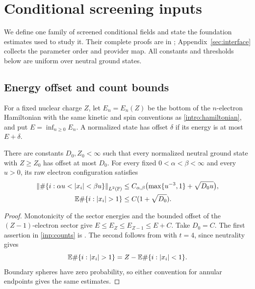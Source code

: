 \section{Conditional screening inputs}\label{sec:inputs}

We define one family of screened conditional fields and state the
foundation estimates used to study it.  Their complete proofs are in
\cite{OuterRadius}; Appendix~\ref{sec:interface} collects the parameter
order and provider map.  All constants and thresholds below are uniform
over neutral ground states.

\subsection{Energy offset and count bounds}

For a fixed nuclear charge $Z$, let $E_n=E_n(Z)$ be the bottom of the
$n$-electron Hamiltonian with the same kinetic and spin conventions as
\eqref{intro:hamiltonian}, and put $E=\inf_{n\ge0}E_n$.
A normalized state has offset $\delta$ if its energy is at most $E+\delta$.

\begin{proposition}\label{inp:energy-counts}
There are constants $D_0,Z_0<\infty$ such that every normalized neutral
ground state with $Z\ge Z_0$ has offset at most $D_0$.
For every fixed $0<\alpha<\beta<\infty$ and every $u>0$, its raw
electron configuration satisfies
\begin{equation}\label{inp:counts}
 \begin{aligned}
 \left\|\#\{i:\alpha u<|x_i|<\beta u\}\right\|_{L^2(\Prob)}
 &\le C_{\alpha,\beta}
       \bigl(\max\{u^{-3},1\}+\sqrt{D_0u}\bigr),\\
 \E\#\{i:|x_i|>1\}&\le C(1+\sqrt{D_0}).
 \end{aligned}
\end{equation}
\end{proposition}

\begin{proof}
Monotonicity of the sector energies
\cite[\FoundationMonotonicity]{OuterRadius} and the bounded offset of the
$(Z-1)$-electron sector \cite[\FoundationOffset]{OuterRadius} give
$E\le E_Z\le E_{Z-1}\le E+C$.  Take $D_0=C$.
The first assertion in \eqref{inp:counts} is
\cite[\FoundationCounts]{OuterRadius}.  The second follows from
\cite[\FoundationDeficit]{OuterRadius} with $t=4$, since neutrality gives
\[
 \E\#\{i:|x_i|>1\}=Z-\E\#\{i:|x_i|<1\}.
\]
Boundary spheres have zero probability, so either convention for
annular endpoints gives the same estimates.
\end{proof}

